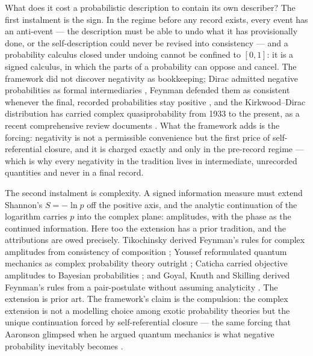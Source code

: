 What does it cost a probabilistic description to contain its own describer? The first instalment is
the sign. In the regime before any record exists, every event has an anti-event --- the description
must be able to undo what it has provisionally done, or the self-description could never be
revised into consistency --- and a probability calculus closed under undoing cannot be confined to
$[0,1]$: it is a signed calculus, in which the parts of a probability can oppose and cancel. The
framework did not discover negativity as bookkeeping; Dirac admitted negative probabilities as
formal intermediaries \autocite{dirac1942}, Feynman defended them as consistent whenever the final,
recorded probabilities stay positive \autocite{Feynman_r_82,Feynman1987}, and the Kirkwood--Dirac
distribution has carried complex quasiprobability from 1933 to the present, as a recent
comprehensive review documents \autocite{arvidssonshukur2024kirkwood}. What the framework adds is
the forcing: negativity is not a permissible convenience but the first price of self-referential
closure, and it is charged exactly and only in the pre-record regime --- which is why every
negativity in the tradition lives in intermediate, unrecorded quantities and never in a final
record.

The second instalment is complexity. A signed information measure must extend Shannon's
$S = -\ln p$ off the positive axis, and the analytic continuation of the logarithm carries $p$ into
the complex plane: amplitudes, with the phase as the continued information. Here too the extension
has a prior tradition, and the attributions are owed precisely. Tikochinsky derived Feynman's rules
for complex amplitudes from consistency of composition \autocite{tikochinsky1988feynman}; Youssef
reformulated quantum mechanics as complex probability theory outright \autocite{Youssef1994};
Caticha carried objective amplitudes to Bayesian probabilities \autocite{caticha_a_2006}; and
Goyal, Knuth and Skilling derived Feynman's rules from a pair-postulate without assuming
analyticity \autocite{goyal_knuth_skilling_2010}. The extension is prior art. The framework's
claim is the compulsion: the complex extension is not a modelling choice among exotic probability
theories but the unique continuation forced by self-referential closure --- the same forcing that
Aaronson glimpsed when he argued quantum mechanics is what negative probability inevitably becomes
\autocite{Aaronson2004h}.

